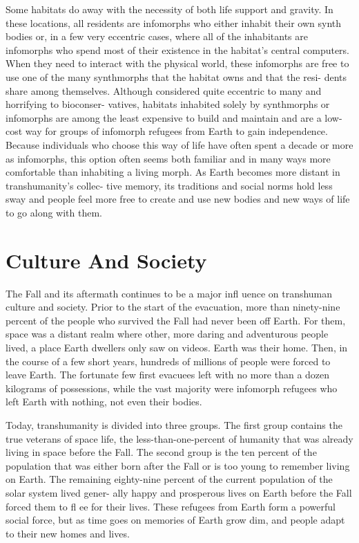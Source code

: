 Some habitats do away with the necessity of 
both life support and gravity. In these locations, all 
residents are infomorphs who either inhabit their own 
synth bodies or, in a few very eccentric cases, where 
all of the inhabitants are infomorphs who spend most 
of their existence in the habitat's central computers. 
When they need to interact with the physical world, 
these infomorphs are free to use one of the many 
synthmorphs that the habitat owns and that the resi-
dents share among themselves. Although considered 
quite eccentric to many and horrifying to bioconser-
vatives, habitats inhabited solely by synthmorphs or 
infomorphs are among the least expensive to build 
and maintain and are a low-cost way for groups of 
infomorph refugees from Earth to gain independence. 
Because individuals who choose this way of life have 
often spent a decade or more as infomorphs, this 
option often seems both familiar and in many ways 
more comfortable than inhabiting a living morph. As 
Earth becomes more distant in transhumanity's collec-
tive memory, its traditions and social norms hold less 
sway and people feel more free to create and use new 
bodies and new ways of life to go along with them.

\section{Culture And Society}

The Fall and its aftermath continues to be a major 
infl uence on transhuman culture and society. Prior 
to the start of the evacuation, more than ninety-nine 
percent of the people who survived the Fall had never 
been off Earth. For them, space was a distant realm 
where other, more daring and adventurous people 
lived, a place Earth dwellers only saw on videos. Earth 
was their home. Then, in the course of a few short 
years, hundreds of millions of people were forced to 
leave Earth. The fortunate few first evacuees left with 
no more than a dozen kilograms of possessions, while 
the vast majority were infomorph refugees who left 
Earth with nothing, not even their bodies.

Today, transhumanity is divided into three groups. 
The first group contains the true veterans of space 
life, the less-than-one-percent of humanity that was 
already living in space before the Fall. The second 
group is the ten percent of the population that was 
either born after the Fall or is too young to remember 
living on Earth. The remaining eighty-nine percent of 
the current population of the solar system lived gener-
ally happy and prosperous lives on Earth before the 
Fall forced them to fl ee for their lives. These refugees 
from Earth form a powerful social force, but as time 
goes on memories of Earth grow dim, and people 
adapt to their new homes and lives.

